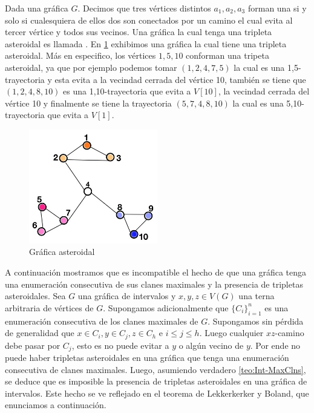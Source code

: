 Dada una gráfica $G$. Decimos que tres vértices distintos $a_1,a_2,a_3$ forman
una  si y solo si cualesquiera de ellos dos son
conectados por un camino el cual evita al tercer vértice y todos sus vecinos.
Una gráfica la cual tenga una tripleta asteroidal es llamada
. En \cref{fig:GrafAstrdl} exhibimos una gráfica
la cual tiene una tripleta asteroidal. Más en especifico, los vértices $1,5,10$
conforman una tripeta asteroidal, ya que por ejemplo podemos tomar $(1,2,4,7,5)$
la cual es una 1,5-trayectoria y esta evita a la vecindad cerrada del vértice
10, también se tiene que $(1,2,4,8,10)$ es una 1,10-trayectoria que evita a
$V[10]$, la vecindad cerrada del vértice 10 y finalmente se tiene la trayectoria
$(5,7,4,8,10)$ la cual es una 5,10-trayectoria que evita a $V[1]$.

\begin{figure}[H]
  \centering
  \includegraphics[width=0.5\textwidth]{recursos/capturas/Ast-Trpl.jpg}
  \caption{Gráfica asteroidal}
  \label{fig:GrafAstrdl}
\end{figure}

A continuación mostramos que es incompatible el hecho de que una gráfica tenga
una enumeración consecutiva de sus clanes maximales y la presencia de tripletas
asteroidales. Sea $G$ una gráfica de intervalos y $x,y,z \in V(G)$ una terna
arbitraria de vértices de $G$. Supongamos adicionalmente que $\{C_i\}_{i=1}^n$
es una enumeración consecutiva de los clanes maximales de $G$. Supongamos sin
pérdida de generalidad que $x\in C_i, y \in C_j, z\in C_h$ e $i\leq j \leq h$.
Luego cualquier $xz$-camino debe pasar por $C_j$, esto es no puede evitar a $y$
o algún vecino de $y$. Por ende no puede haber tripletas asteroidales en una
gráfica que tenga una enumeración consecutiva de clanes maximales. Luego,
asumiendo verdadero \cref{teo:Int-MaxClns}, se deduce que es imposible la
presencia de tripletas asteroidales en una gráfica de intervalos. Este hecho se
ve reflejado en el teorema de Lekkerkerker y Boland, que enunciamos a
continuación.

